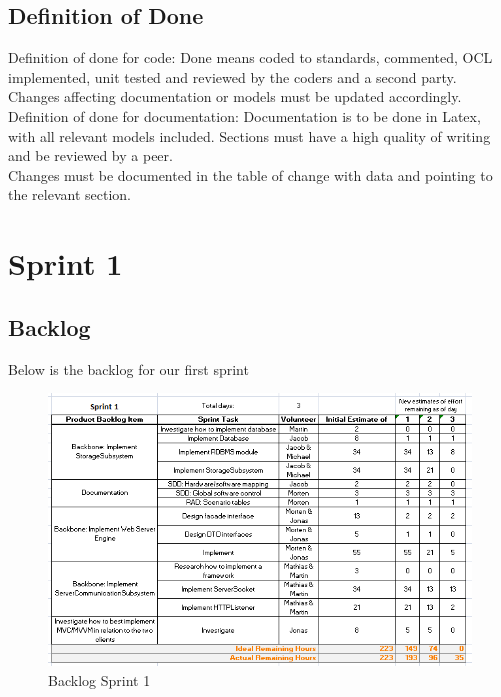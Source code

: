 \subsection{Definition of Done}
\label{sec:Definition of Done}
Definition of done for code:
Done means coded to standards, commented, OCL implemented, unit tested and reviewed by the coders and a second party. Changes affecting documentation or models must be updated accordingly. \\


\noindent Definition of done for documentation:
Documentation is to be done in Latex, with all relevant models included. Sections must have a high quality of writing and be reviewed by a peer. \\
Changes must be documented in the table of change with data and pointing to the relevant section.


\section{Sprint 1}
\label{chap:Spring 1}


\subsection{Backlog}
Below is the backlog for our first sprint
\begin{figure}[h]
\begin{center}
\includegraphics[scale=0.75]{img/SCRUM/backlogSprint1.png}
\caption{Backlog Sprint 1}
\label{fig:Backlog Sprint 1}
\end{center}
\end{figure}

\newpage
